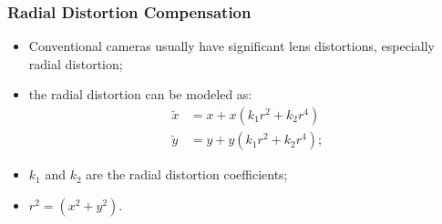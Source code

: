 \documentclass{beamer}
\begin{document}
		\begin{frame}\frametitle{Radial Distortion Compensation}
			\begin{itemize}
			 \item Conventional cameras usually have significant lens distortions, especially radial distortion;
			 \item the radial distortion can be modeled as:
			\begin{align*}
			\breve{x} &= x + x(k_1 r^2 + k_2 r^4) \\%
			\breve{y} &= y + y(k_1 r^2 + k_2 r^4); %
			\end{align*}
			\item $k_1$ and $k_2$ are the radial distortion coefficients;
			\item $r^2 = (x^2 + y^2)$.
			\end{itemize}
		\end{frame}


\end{document}
